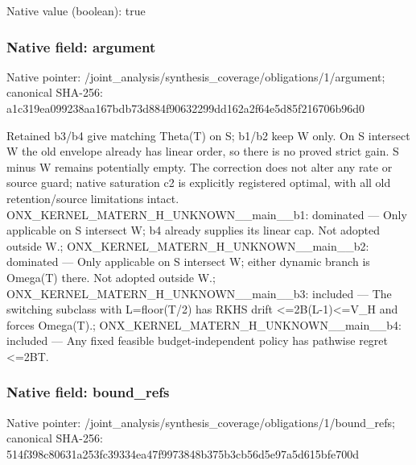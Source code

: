 \documentclass[10pt,a4paper]{article}
\begin{document}
Native value (boolean): true

\subsubsection{Native field: argument}
Native pointer: /joint\_\allowbreak{}analysis/synthesis\_\allowbreak{}coverage/obligations/1/argument; canonical SHA-256: a1c319ea099238aa167bdb73d884f90632299dd162a2f64e5d85f216706b96d0

\begingroup\raggedright\sloppy Retained b3/\allowbreak{}b4 give matching Theta(T) on S;\allowbreak{} b1/\allowbreak{}b2 keep W only. On S intersect W the old envelope already has linear order,\allowbreak{} so there is no proved strict gain. S minus W remains potentially empty. The correction does not alter any rate or source guard;\allowbreak{} native saturation c2 is explicitly registered optimal,\allowbreak{} with all old retention/\allowbreak{}source limitations intact. ONX\_\allowbreak{}KERNEL\_\allowbreak{}MATERN\_\allowbreak{}H\_\allowbreak{}UNKNOWN\_\allowbreak{}\_\allowbreak{}main\_\allowbreak{}\_\allowbreak{}b1:\allowbreak{} dominated {\AtlasUnicodeText —}\allowbreak{} Only applicable on S intersect W;\allowbreak{} b4 already supplies its linear cap. Not adopted outside W.;\allowbreak{} ONX\_\allowbreak{}KERNEL\_\allowbreak{}MATERN\_\allowbreak{}H\_\allowbreak{}UNKNOWN\_\allowbreak{}\_\allowbreak{}main\_\allowbreak{}\_\allowbreak{}b2:\allowbreak{} dominated {\AtlasUnicodeText —}\allowbreak{} Only applicable on S intersect W;\allowbreak{} either dynamic branch is Omega(T) there. Not adopted outside W.;\allowbreak{} ONX\_\allowbreak{}KERNEL\_\allowbreak{}MATERN\_\allowbreak{}H\_\allowbreak{}UNKNOWN\_\allowbreak{}\_\allowbreak{}main\_\allowbreak{}\_\allowbreak{}b3:\allowbreak{} included {\AtlasUnicodeText —}\allowbreak{} The switching subclass with L=\allowbreak{}floor(T/\allowbreak{}2) has RKHS drift <=\allowbreak{}2B(L-1)<=\allowbreak{}V\_\allowbreak{}H and forces Omega(T).;\allowbreak{} ONX\_\allowbreak{}KERNEL\_\allowbreak{}MATERN\_\allowbreak{}H\_\allowbreak{}UNKNOWN\_\allowbreak{}\_\allowbreak{}main\_\allowbreak{}\_\allowbreak{}b4:\allowbreak{} included {\AtlasUnicodeText —}\allowbreak{} Any fixed feasible budget-independent policy has pathwise regret <=\allowbreak{}2BT.\par\endgroup

\subsubsection{Native field: bound\_\allowbreak{}refs}
Native pointer: /joint\_\allowbreak{}analysis/synthesis\_\allowbreak{}coverage/obligations/1/bound\_\allowbreak{}refs; canonical SHA-256: 514f398c80631a253fc39334ea47f9973848b375b3cb56d5e97a5d615bfe700d
\end{document}
